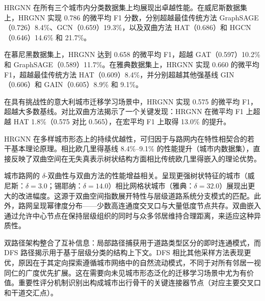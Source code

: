 HRGNN 在所有三个城市内分类数据集上均展现出卓越性能。在威尼斯数据集上，HRGNN 实现 0.786 的微平均 F1 分数，分别超越最佳传统方法 GraphSAGE（0.726）8.4\%、GCN（0.659）19.3\%，以及双曲方法 HAT（0.686）和 HGCN（0.646）14.6\% 和 21.7\%。

在慕尼黑数据集上，HRGNN 达到 0.658 的微平均 F1，超越 GAT（0.597）10.2\% 和 GraphSAGE（0.589）11.7\%。在雅典数据集上，HRGNN 实现 0.660 的微平均 F1，超越最佳传统方法 HAT（0.609）8.4\%，并分别超越其他强基线 GIN（0.606）和 GAIN（0.605）8.9\% 和 9.1\%。

在具有挑战性的意大利城市迁移学习场景中，HRGNN 实现 0.575 的微平均 F1，超越大多数基线。对比双曲方法揭示了一个关键发现：HRGNN 在微平均 F1 上超越 HAT 1.8\%（0.575 对比 0.565），在宏平均 F1 上取得 13.0\% 的提升。

HRGNN 在多样城市形态上的持续优越性，可归因于与路网内在特性相契合的若干基本理论原理。相比欧几里得基线 8.4\%--9.1\% 的性能提升（城市内数据集），直接反映了双曲空间在无失真表示树状结构方面相比传统欧几里得嵌入的理论优势。

城市路网的 $\delta$-双曲性与双曲方法的性能增益相关。呈现更强树状特征的城市（威尼斯：$\delta=3.0$；锡耶纳：$\delta=14.0$）相比网格状城市（雅典：$\delta=32.0$）展现出更大的改进幅度。这源于双曲空间指数展开特性与层级道路系统分支模式的匹配。此外，路网呈现幂律度分布——少数高连通度交叉口与大量低度节点共存。双曲嵌入通过允许中心节点在保持层级组织的同时与众多邻居维持合理距离，来适应这种异质性。

双路径架构整合了互补信息：局部路径捕获用于道路类型区分的即时连通模式，而 DFS 路径揭示用于基于层级分类的结构上下文。DFS 相比其他采样方法表现更优，原因在于其定向探索遵循城市网络中的自然流动模式，不同于对所有邻居一视同仁的广度优先扩展。这在需要向未见城市形态泛化的迁移学习场景中尤为有价值。重要性评分机制识别出构成城市出行骨干的关键连接器节点（对应主要交叉口和干道交汇点）。

